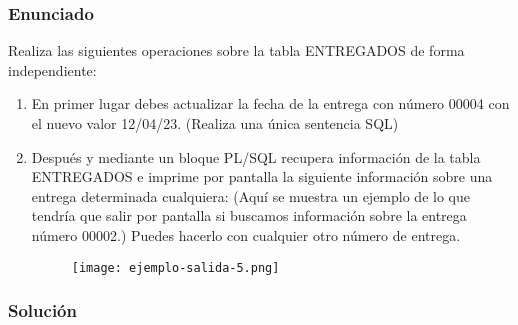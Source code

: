 \subsubsection{Enunciado}
Realiza las siguientes operaciones sobre la tabla ENTREGADOS de forma independiente:
\begin{enumerate}[label=\alph*)]
    \item En primer lugar debes actualizar la fecha de la entrega con número 00004 con el nuevo valor 12/04/23. (Realiza una única sentencia SQL)
    \item Después y mediante un bloque PL/SQL recupera información de la tabla ENTREGADOS e imprime por pantalla la siguiente información sobre una entrega determinada cualquiera: (Aquí se muestra un ejemplo de lo que tendría que salir por pantalla si buscamos información sobre la entrega número 00002.) Puedes hacerlo con cualquier otro número de entrega.

    \begin{figure}[H]
        \centering
        \texttt{[image: ejemplo-salida-5.png]}
    \end{figure}
\end{enumerate}

\subsubsection{Solución}

%
%

